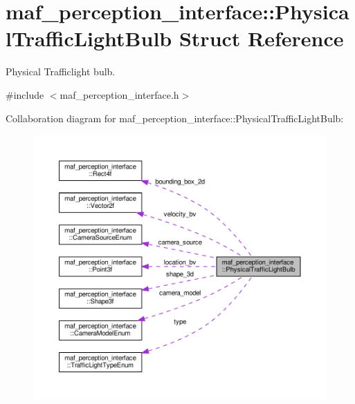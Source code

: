 \hypertarget{structmaf__perception__interface_1_1PhysicalTrafficLightBulb}{}\section{maf\+\_\+perception\+\_\+interface\+:\+:Physical\+Traffic\+Light\+Bulb Struct Reference}
\label{structmaf__perception__interface_1_1PhysicalTrafficLightBulb}


Physical Trafficlight bulb.  




{\ttfamily \#include $<$maf\+\_\+perception\+\_\+interface.\+h$>$}



Collaboration diagram for maf\+\_\+perception\+\_\+interface\+:\+:Physical\+Traffic\+Light\+Bulb\+:\nopagebreak
\begin{figure}[H]
\begin{center}
\leavevmode
\includegraphics[width=350pt]{structmaf__perception__interface_1_1PhysicalTrafficLightBulb__coll__graph}
\end{center}
\end{figure}
